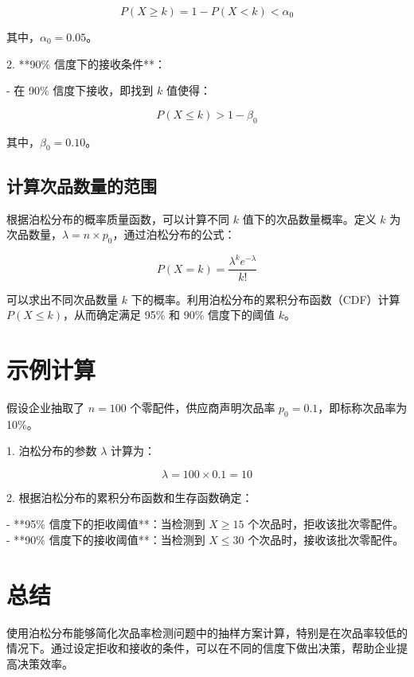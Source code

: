 \documentclass{article}
\begin{document}
    \[
    P(X \geq k) = 1 - P(X < k) < \alpha_0
    \]
    
    其中，\( \alpha_0 = 0.05 \)。
    
2. **90\% 信度下的接收条件**：
    
    - 在 90\% 信度下接收，即找到 \( k \) 值使得：
    
    \[
    P(X \leq k) > 1 - \beta_0
    \]
    
    其中，\( \beta_0 = 0.10 \)。
    
\subsection{计算次品数量的范围}

根据泊松分布的概率质量函数，可以计算不同 \( k \) 值下的次品数量概率。定义 \( k \) 为次品数量，\( \lambda = n \times p_0 \)，通过泊松分布的公式：

\[
P(X = k) = \frac{\lambda^k e^{-\lambda}}{k!}
\]

可以求出不同次品数量 \( k \) 下的概率。利用泊松分布的累积分布函数（CDF）计算 \( P(X \leq k) \)，从而确定满足 95\% 和 90\% 信度下的阈值 \( k \)。

\section{示例计算}

假设企业抽取了 \( n = 100 \) 个零配件，供应商声明次品率 \( p_0 = 0.1 \)，即标称次品率为 10\%。

1. 泊松分布的参数 \( \lambda \) 计算为：
   
\[
\lambda = 100 \times 0.1 = 10
\]

2. 根据泊松分布的累积分布函数和生存函数确定：

    - **95\% 信度下的拒收阈值**：当检测到 \( X \geq 15 \) 个次品时，拒收该批次零配件。
    - **90\% 信度下的接收阈值**：当检测到 \( X \leq 30 \) 个次品时，接收该批次零配件。

\section{总结}

使用泊松分布能够简化次品率检测问题中的抽样方案计算，特别是在次品率较低的情况下。通过设定拒收和接收的条件，可以在不同的信度下做出决策，帮助企业提高决策效率。
\end{document}
